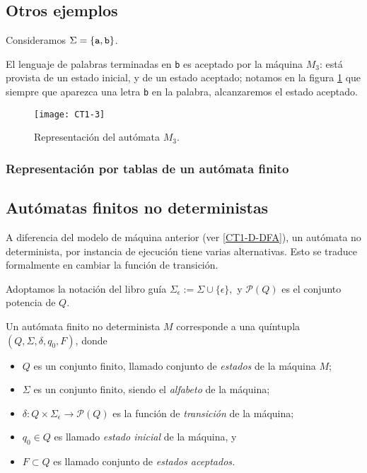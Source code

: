 \subsection{Otros ejemplos}

Consideramos \(\Sigma=\{{\tt a},{\tt b}\}\).

\begin{ejemplo}
    El lenguaje de palabras terminadas en {\tt b} es aceptado por la m\'aquina \(M_3\): est\'a provista de un estado inicial, y de un estado aceptado; notamos en la figura \ref{CT1-3} que siempre que aparezca una letra {\tt b} en la palabra, alcanzaremos el estado aceptado.

    \begin{figure}[h!b]
        \centering
		\texttt{[image: CT1-3]}
		\caption{Representaci\'on del aut\'omata \(M_3.\)}\label{CT1-3}
    \end{figure}
\end{ejemplo}


\subsubsection{Representaci\'on por tablas de un aut\'omata finito}


\subsection{Aut\'omatas finitos no deterministas}

A diferencia del modelo de m\'aquina anterior (ver \ref{CT1-D-DFA}), un aut\'omata no determinista, por instancia de ejecuci\'on tiene varias alternativas. Esto se traduce formalmente en cambiar la funci\'on de transici\'on.

Adoptamos la notaci\'on del libro gu\'ia \(\Sigma_\epsilon:=\Sigma\cup \{\epsilon\},\) y \(\mathcal{P}(Q)\) es el conjunto potencia de \(Q.\) 

\begin{definicion}\label{CT1-D-NFA}
    Un aut\'omata finito no determinista \(M\) corresponde a una qu\'intupla \((Q,\Sigma,\delta,q_0,F)\), donde
    \begin{itemize}
        \item \(Q\) es un conjunto finito, llamado conjunto de \emph{estados} de la m\'aquina \(M\);
        \item \(\Sigma\) es un conjunto finito, siendo el \emph{alfabeto} de la m\'aquina;
        \item \(\delta: Q \times \Sigma_\epsilon \to \mathcal{P}(Q) \) es la funci\'on de \emph{transici\'on} de la m\'aquina;
        \item \(q_0\in Q\) es llamado \emph{estado inicial} de la m\'aquina, y
        \item \(F\subset Q\) es llamado conjunto de \emph{estados aceptados.}
    \end{itemize}
\end{definicion}

